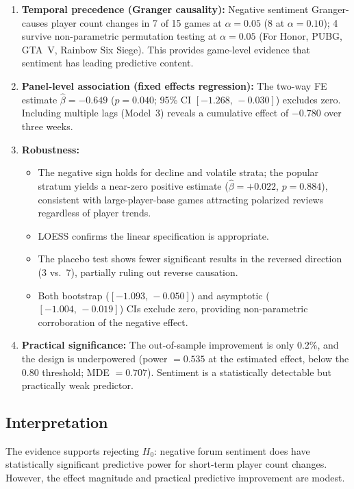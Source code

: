 \documentclass[11pt, letterpaper]{article}
\begin{document}
\begin{enumerate}
    \item \textbf{Temporal precedence (Granger causality):} Negative sentiment Granger-causes player count changes in 7 of 15 games at $\alpha = 0.05$ (8 at $\alpha = 0.10$); 4 survive non-parametric permutation testing at $\alpha = 0.05$ (For Honor, PUBG, GTA~V, Rainbow Six Siege).
    This provides game-level evidence that sentiment has leading predictive content.

    \item \textbf{Panel-level association (fixed effects regression):} The two-way FE estimate $\hat{\beta} = -0.649$ ($p = 0.040$; 95\% CI $[-1.268,\,-0.030]$) excludes zero.
    Including multiple lags (Model~3) reveals a cumulative effect of $-0.780$ over three weeks.

    \item \textbf{Robustness:}
    \begin{itemize}[nosep]
        \item The negative sign holds for decline and volatile strata; the popular stratum yields a near-zero positive estimate ($\hat{\beta} = +0.022$, $p = 0.884$), consistent with large-player-base games attracting polarized reviews regardless of player trends.
        \item LOESS confirms the linear specification is appropriate.
        \item The placebo test shows fewer significant results in the reversed direction (3 vs.\ 7), partially ruling out reverse causation.
        \item Both bootstrap ($[-1.093,\,-0.050]$) and asymptotic ($[-1.004,\,-0.019]$) CIs exclude zero, providing non-parametric corroboration of the negative effect.
    \end{itemize}

    \item \textbf{Practical significance:} The out-of-sample improvement is only 0.2\%, and the design is underpowered (power $= 0.535$ at the estimated effect, below the 0.80 threshold; MDE $= 0.707$).
    Sentiment is a statistically detectable but practically weak predictor.
\end{enumerate}

\subsection{Interpretation}

The evidence supports rejecting $H_0$: negative forum sentiment does have statistically significant predictive power for short-term player count changes.
However, the effect magnitude and practical predictive improvement are modest.
\end{document}

